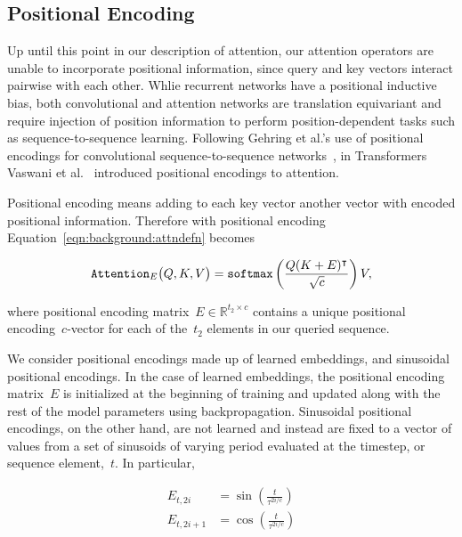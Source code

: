\subsection{Positional Encoding}

Up until this point in our description of attention, our attention operators
are unable to incorporate positional information, since query and key vectors
interact pairwise with each other.
Whlie recurrent networks have a positional inductive bias, both convolutional
and attention networks are translation equivariant and require injection of
position information to perform position-dependent tasks such as
sequence-to-sequence learning.
Following Gehring et al.'s use of positional encodings for convolutional
sequence-to-sequence networks~\cite{gehring2017convolutional}, in Transformers
Vaswani et al.~\cite{vaswani2017attention} introduced positional encodings to
attention.

Positional encoding means adding to each key vector another vector with encoded
positional information.
Therefore with positional encoding Equation~\ref{eqn:background:attndefn} becomes

\begin{equation}
\mathtt{Attention}_E\big(Q, K, V\big) = \mathtt{softmax}{}\left(\frac{Q(K + E)^\intercal}{\sqrt{c}}\right) V,
\label{eqn:background:posenc-attn}
\end{equation}

where positional encoding matrix~$E \in \mathbb{R}^{t_2\times c}$ contains a
unique positional encoding~$c$-vector for each of the~$t_2$ elements in our
queried sequence.

We consider positional encodings made up of learned embeddings, and sinusoidal
positional encodings.
In the case of learned embeddings, the positional encoding matrix~$E$ is
initialized at the beginning of training and updated along with the rest of the
model parameters using backpropagation.
Sinusoidal positional encodings, on the other hand, are not learned and instead
are fixed to a vector of values from a set of sinusoids of varying period
evaluated at the timestep, or sequence element,~$t$.
In particular,

\begin{equation}
\begin{split}
E_{t, 2i} &= \sin\left(\frac{t}{\tau^{2i/c}}\right) \\
E_{t, 2i + 1} &= \cos\left(\frac{t}{\tau^{2i/c}}\right)
\end{split}
\end{equation}

